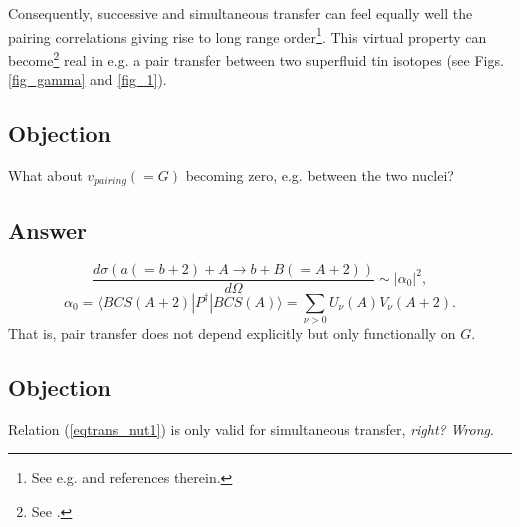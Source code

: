 Consequently, successive and simultaneous transfer can feel equally well the pairing correlations giving rise to long range order\footnote{See e.g. \cite{Potel:17} and references therein.}. This virtual property can become\footnote{See \cite{Oertzen:13,vonOertzen:01}.} real in e.g. a pair transfer between two superfluid tin isotopes (see Figs. \ref{fig_gamma} and \ref{fig_1}).
\subsection*{Objection}
What about $v_{pairing}(=G)$ becoming zero, e.g. between the two nuclei?
\subsection*{Answer}
\begin{equation}
\frac{d\sigma(a(=b+2)+A\rightarrow b+B(=A+2))}{d\Omega}\sim |\alpha_0|^2,
\end{equation}
\begin{equation}\label{eqtrans_nut1}
\alpha_0=\langle BCS(A+2) |P^\dagger|BCS(A)\rangle=\sum_{\nu>0}U_{\nu}(A)V_{\nu}(A+2).
\end{equation}
That is, pair transfer does not depend explicitly but only functionally on $G$.
\subsection*{Objection}
Relation (\ref{eqtrans_nut1}) is only valid for simultaneous transfer, \textit{right?} \textit{Wrong}.
